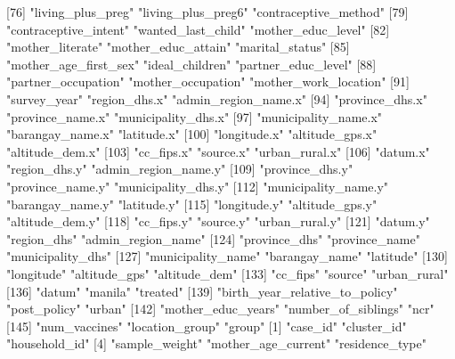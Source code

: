  [76] "living_plus_preg"              "living_plus_preg6"             "contraceptive_method"         
 [79] "contraceptive_intent"          "wanted_last_child"             "mother_educ_level"            
 [82] "mother_literate"               "mother_educ_attain"            "marital_status"               
 [85] "mother_age_first_sex"          "ideal_children"                "partner_educ_level"           
 [88] "partner_occupation"            "mother_occupation"             "mother_work_location"         
 [91] "survey_year"                   "region_dhs.x"                  "admin_region_name.x"          
 [94] "province_dhs.x"                "province_name.x"               "municipality_dhs.x"           
 [97] "municipality_name.x"           "barangay_name.x"               "latitude.x"                   
[100] "longitude.x"                   "altitude_gps.x"                "altitude_dem.x"               
[103] "cc_fips.x"                     "source.x"                      "urban_rural.x"                
[106] "datum.x"                       "region_dhs.y"                  "admin_region_name.y"          
[109] "province_dhs.y"                "province_name.y"               "municipality_dhs.y"           
[112] "municipality_name.y"           "barangay_name.y"               "latitude.y"                   
[115] "longitude.y"                   "altitude_gps.y"                "altitude_dem.y"               
[118] "cc_fips.y"                     "source.y"                      "urban_rural.y"                
[121] "datum.y"                       "region_dhs"                    "admin_region_name"            
[124] "province_dhs"                  "province_name"                 "municipality_dhs"             
[127] "municipality_name"             "barangay_name"                 "latitude"                     
[130] "longitude"                     "altitude_gps"                  "altitude_dem"                 
[133] "cc_fips"                       "source"                        "urban_rural"                  
[136] "datum"                         "manila"                        "treated"                      
[139] "birth_year_relative_to_policy" "post_policy"                   "urban"                        
[142] "mother_educ_years"             "number_of_siblings"            "ncr"                          
[145] "num_vaccines"                  "location_group"                "group"                        
  [1] "case_id"                       "cluster_id"                    "household_id"                 
  [4] "sample_weight"                 "mother_age_current"            "residence_type"               
